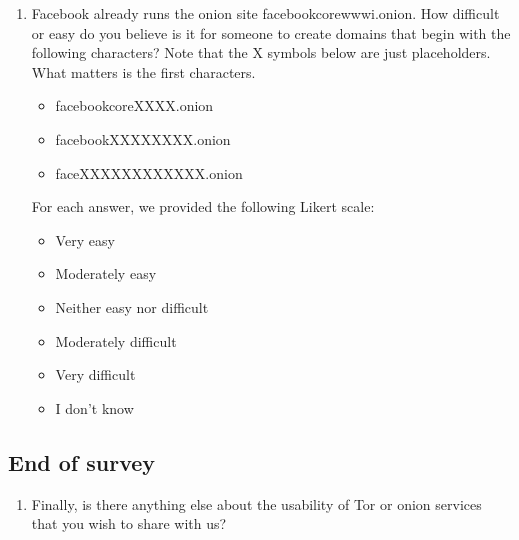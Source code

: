 \begin{enumerate}
    \item Facebook already runs the onion site facebookcorewwwi.onion. How
        difficult or easy do you believe is it for someone to create domains
        that begin with the following characters? Note that the X symbols below
        are just placeholders. What matters is the first characters.
        \begin{itemize}
            \item facebookcoreXXXX.onion
            \item facebookXXXXXXXX.onion
            \item faceXXXXXXXXXXXX.onion
        \end{itemize}
        For each answer, we provided the following Likert scale:
        \begin{itemize}
            \item Very easy
            \item Moderately easy
            \item Neither easy nor difficult
            \item Moderately difficult
            \item Very difficult
            \item I don't know
        \end{itemize}
\end{enumerate}

\subsection{End of survey}
\begin{enumerate}
    \item Finally, is there anything else about the usability of Tor or onion
        services that you wish to share with us?
\end{enumerate}
